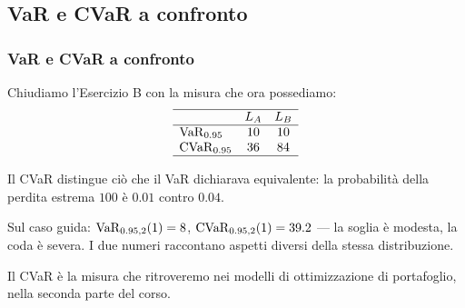 

\subsection{VaR e CVaR a confronto}%

\begin{frame}%
%

\frametitle{VaR e CVaR a confronto}%
%

%


Chiudiamo l'Esercizio B con la misura che ora possediamo:
\[%
\begin{array}
[c]{lcc}\hline
& L_{A} & L_{B}\\\hline
\VaR_{0.95} & 10 & 10\\
\CVaR_{0.95} & 36 & 84\\\hline
\end{array}
\]


\medskip

\begin{stepitemize}
\item Il CVaR distingue ci\`{o} che il VaR dichiarava equivalente: la
probabilit\`{a} della perdita estrema $100$ \`{e} $0.01$ contro $0.04$.

\item Sul caso guida: $\operatorname{VaR}_{0.95,2}(1)=8$, $\operatorname{CVaR}_{0.95,2}(1)=39.2$ --- la
soglia \`{e} modesta, la coda \`{e} severa. I due numeri raccontano aspetti
diversi della stessa distribuzione.

\item Il CVaR \`{e} la misura che ritroveremo nei modelli di ottimizzazione di
portafoglio, nella seconda parte del corso.
\end{stepitemize}

%

\transboxout
\end{frame}%




